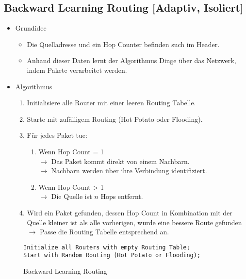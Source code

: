         \subsection{Backward Learning Routing [Adaptiv, Isoliert]}
            \begin{itemize}
            	\item Grundidee
	            	\begin{itemize}
	            		\item Die Quelladresse und ein Hop Counter befinden such im Header.
	            		\item Anhand dieser Daten lernt der Algorithmus Dinge über das Netzwerk, indem Pakete verarbeitet werden.
	            	\end{itemize}
	            \item Algorithmus
		            \begin{enumerate}
		            	\item Initialisiere alle Router mit einer leeren Routing Tabelle.
		            	\item Starte mit zufälligem Routing (Hot Potato oder Flooding).
		            	\item Für jedes Paket tue:
			            	\begin{enumerate}
			            		\item Wenn Hop Count = 1
				            	   \\ \(\rightarrow\) Das Paket kommt direkt von einem Nachbarn.
				            	   \\ \(\rightarrow\) Nachbarn werden über ihre Verbindung identifiziert.
				            	\item Wenn Hop Count > 1
				            	   \\ \(\rightarrow\) Die Quelle ist \(n\) Hops entfernt.
			            	\end{enumerate}
			            \item Wird ein Paket gefunden, dessen Hop Count in Kombination mit der Quelle kleiner ist als alle vorherigen, wurde eine bessere Route gefunden
			               \\ \(\rightarrow\) Passe die Routing Tabelle entsprechend an.
		            \end{enumerate}
            \end{itemize}
            \begin{figure}[H]
            	\centering
            	\begin{lstlisting}
Initialize all Routers with empty Routing Table;
Start with Random Routing (Hot Potato or Flooding);
            	\end{lstlisting}
            	\caption{Backward Learning Routing}
            \end{figure}

